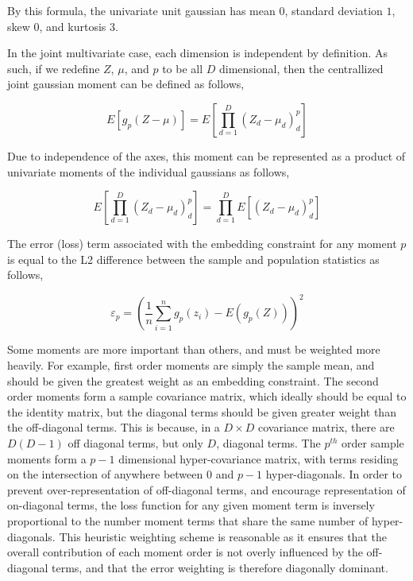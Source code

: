\documentclass[10pt,twocolumn,letterpaper]{article}
\begin{document}
By this formula, the univariate unit gaussian has mean $0$, standard deviation $1$, skew $0$, and kurtosis 3.

In the joint multivariate case, each dimension is independent by definition.  As such, if we redefine $Z$, $\mu$, and $p$ to be all $D$ dimensional, then the centrallized joint gaussian moment can be defined as follows,

\begin{equation}
	E\left[g_p(Z - \mu)\right] = E\left[ \prod_{d=1}^D (Z_d - \mu_d)^p_d \right]
\end{equation}

Due to independence of the axes, this moment can be represented as a product of univariate moments of the individual gaussians as follows,

\begin{equation}
	E\left[ \prod_{d=1}^D (Z_d - \mu_d)^p_d \right] = \prod_{d=1}^D E\left[ (Z_d - \mu_d)^p_d \right]
\end{equation}

The error (loss) term associated with the embedding constraint for any moment $p$ is equal to the L2 difference between the sample and population statistics as follows,

\begin{equation}
	\varepsilon_p = \left( \frac{1}{n} \sum_{i=1}^n g_p(z_i) - E(g_p(Z)) \right)^2
\end{equation}

Some moments are more important than others, and must be weighted more heavily.  For example, first order moments are simply the sample mean, and should be given the greatest weight as an embedding constraint.  The second order moments form a sample covariance matrix, which ideally should be equal to the identity matrix, but the diagonal terms should be given greater weight than the off-diagonal terms.  This is because, in a $D \times D$ covariance matrix, there are $D(D-1)$ off diagonal terms, but only $D$, diagonal terms.  The $p^{th}$ order sample moments form a $p-1$ dimensional hyper-covariance matrix, with terms residing on the intersection of anywhere between $0$ and $p-1$ hyper-diagonals.  In order to prevent over-representation of off-diagonal terms, and encourage representation of on-diagonal terms, the loss function for any given moment term is inversely proportional to the number moment terms that share the same number of hyper-diagonals.  This heuristic weighting scheme is reasonable as it ensures that the overall contribution of each moment order is not overly influenced by the off-diagonal terms, and that the error weighting is therefore diagonally dominant.
\end{document}
